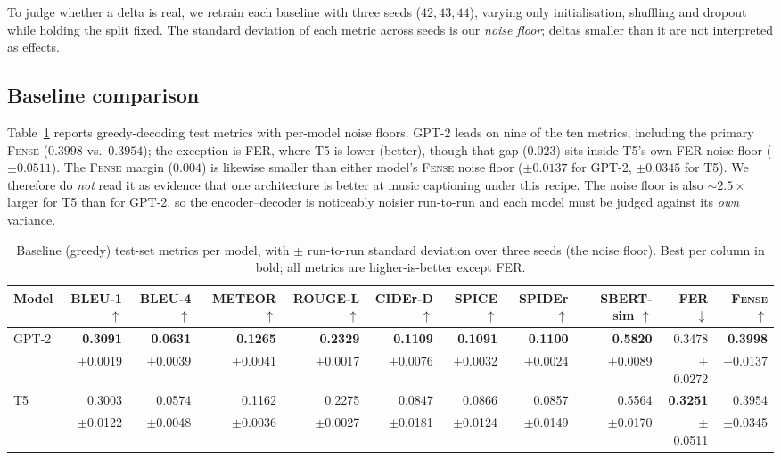 \documentclass[conference]{IEEEtran}
\newcommand{\fense}{\textsc{Fense}}
\begin{document}
To judge whether a delta is real, we retrain each baseline with three seeds
($42,43,44$), varying only initialisation, shuffling and dropout while holding the split fixed.
The standard deviation of each metric across seeds is our \emph{noise floor}; deltas smaller
than it are not interpreted as effects.

\subsection{Baseline comparison}\label{sec:baseline}

Table~\ref{tab:baseline} reports greedy-decoding test metrics with per-model noise floors. GPT-2
leads on nine of the ten metrics, including the primary \fense{} ($0.3998$ vs.\ $0.3954$); the
exception is FER, where T5 is lower (better), though that gap ($0.023$) sits inside T5's own FER
noise floor ($\pm0.0511$). The \fense{} margin ($0.004$) is likewise smaller than either model's
\fense{} noise floor ($\pm0.0137$ for GPT-2, $\pm0.0345$ for T5). We therefore do \emph{not}
read it as evidence that one architecture is better at music captioning under this recipe. The
noise floor is also $\sim$$2.5\times$ larger for T5 than for GPT-2, so the encoder--decoder is
noticeably noisier run-to-run and each model must be judged against its \emph{own} variance.

\begin{table}[!t]
\centering
\caption{Baseline (greedy) test-set metrics per model, with $\pm$ run-to-run standard deviation
over three seeds (the noise floor). Best per column in bold; all metrics are higher-is-better
except FER.}
\label{tab:baseline}
\footnotesize
\setlength{\tabcolsep}{4pt}
\begin{tabular}{lrrrrrrrrrr}
\toprule
Model & BLEU-1 $\uparrow$ & BLEU-4 $\uparrow$ & METEOR $\uparrow$ & ROUGE-L $\uparrow$ &
CIDEr-D $\uparrow$ & SPICE $\uparrow$ & SPIDEr $\uparrow$ & SBERT-sim $\uparrow$ &
FER $\downarrow$ & \fense{} $\uparrow$ \\
\midrule
GPT-2 & \textbf{0.3091} & \textbf{0.0631} & \textbf{0.1265} & \textbf{0.2329} &
\textbf{0.1109} & \textbf{0.1091} & \textbf{0.1100} & \textbf{0.5820} & 0.3478 &
\textbf{0.3998} \\
 & \scriptsize$\pm$0.0019 & \scriptsize$\pm$0.0039 & \scriptsize$\pm$0.0041 &
\scriptsize$\pm$0.0017 & \scriptsize$\pm$0.0076 & \scriptsize$\pm$0.0032 &
\scriptsize$\pm$0.0024 & \scriptsize$\pm$0.0089 & \scriptsize$\pm$0.0272 &
\scriptsize$\pm$0.0137 \\
T5 & 0.3003 & 0.0574 & 0.1162 & 0.2275 & 0.0847 & 0.0866 & 0.0857 & 0.5564 &
\textbf{0.3251} & 0.3954 \\
 & \scriptsize$\pm$0.0122 & \scriptsize$\pm$0.0048 & \scriptsize$\pm$0.0036 &
\scriptsize$\pm$0.0027 & \scriptsize$\pm$0.0181 & \scriptsize$\pm$0.0124 &
\scriptsize$\pm$0.0149 & \scriptsize$\pm$0.0170 & \scriptsize$\pm$0.0511 &
\scriptsize$\pm$0.0345 \\
\bottomrule
\end{tabular}
\end{table}
\end{document}
